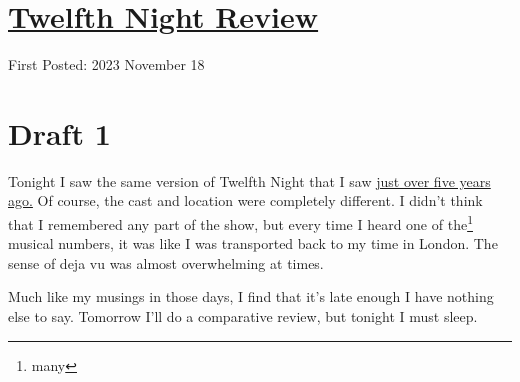 \documentclass[12pt]{article}[titlepage]
\newcommand{\1}{\={a}}
\newcommand{\2}{\={e}}
\newcommand{\3}{\={\i}}
\newcommand{\4}{\=o}
\newcommand{\5}{\=u}
\newcommand{\6}{\={A}}
\renewcommand{\,}{\textsuperscript{,}}
\begin{document}
\doublespacing
\section{\href{twelfth-night-23.html}{Twelfth Night Review}}
First Posted: 2023 November 18
\section{Draft 1}
Tonight I saw the same version of Twelfth Night that I saw \href{twelfth-night.html}{just over five years ago.}
Of course, the cast and location were completely different.
I didn't think that I remembered any part of the show, but every time I heard one of the\footnote{many} musical numbers, it was like I was transported back to my time in London.
The sense of deja vu was almost overwhelming at times.

Much like my musings in those days, I find that it's late enough I have nothing else to say.
Tomorrow I'll do a comparative review, but tonight I must sleep.
\end{document}

